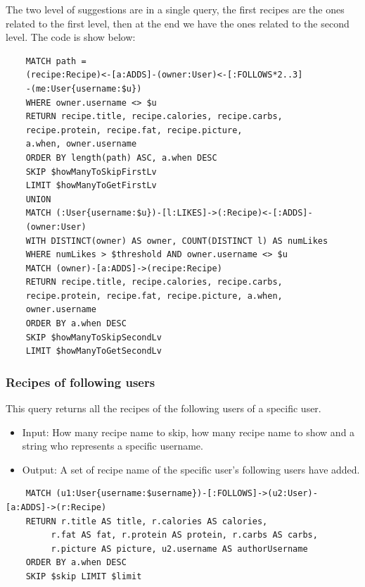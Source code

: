 \documentclass[a4paper]{report}
\begin{document}
\noindent The two level of suggestions are in a single query, the first recipes are the ones related to the first level, then at the end we have the ones related to the second level. The code is show below:

\begin{lstlisting}
	MATCH path =
	(recipe:Recipe)<-[a:ADDS]-(owner:User)<-[:FOLLOWS*2..3]
	-(me:User{username:$u})
	WHERE owner.username <> $u
	RETURN recipe.title, recipe.calories, recipe.carbs,
	recipe.protein, recipe.fat, recipe.picture,
	a.when, owner.username
	ORDER BY length(path) ASC, a.when DESC
	SKIP $howManyToSkipFirstLv
	LIMIT $howManyToGetFirstLv
	UNION
	MATCH (:User{username:$u})-[l:LIKES]->(:Recipe)<-[:ADDS]-
	(owner:User)
	WITH DISTINCT(owner) AS owner, COUNT(DISTINCT l) AS numLikes
	WHERE numLikes > $threshold AND owner.username <> $u
	MATCH (owner)-[a:ADDS]->(recipe:Recipe)
	RETURN recipe.title, recipe.calories, recipe.carbs,
	recipe.protein, recipe.fat, recipe.picture, a.when,
	owner.username
	ORDER BY a.when DESC
	SKIP $howManyToSkipSecondLv
	LIMIT $howManyToGetSecondLv	
\end{lstlisting}

\subsubsection{Recipes of following users}
This query returns all the recipes of the following users of a specific user.
\begin{itemize}
	\item Input: How many recipe name to skip, how many recipe name to show and a string who represents a specific username.
	\item Output: A set of recipe name of the specific user's following users have added.
\end{itemize}
\lstset{ language=java}
\begin{lstlisting}
	MATCH (u1:User{username:$username})-[:FOLLOWS]->(u2:User)-[a:ADDS]->(r:Recipe)
	RETURN r.title AS title, r.calories AS calories,
		 r.fat AS fat, r.protein AS protein, r.carbs AS carbs,
		 r.picture AS picture, u2.username AS authorUsername 
	ORDER BY a.when DESC 
	SKIP $skip LIMIT $limit
\end{lstlisting}
\end{document}
